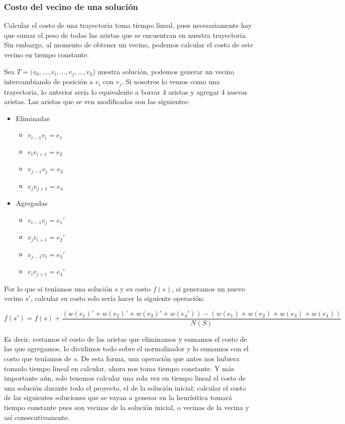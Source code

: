 \documentclass{article}
\begin{document}
  \subsubsection{Costo del vecino de una solución}
  Calcular el costo de una trayectoria toma tiempo lineal, pues 
  necesariamente hay que sumar el peso de todas las aristas que 
  se encuentran en nuestra trayectoria. Sin embargo, al momento 
  de obtener un vecino, podemos calcular el costo de este 
  vecino en tiempo constante.

  Sea $T = (v_0, ..., v_i, ..., v_j, ..., v_k$) nuestra 
  solución, podemos generar un vecino intercambiando de posición
  a $v_i$ con $v_j$. Si nosotros lo vemos como una trayectoria,
  lo anterior sería lo equivalente a borrar 4 aristas y 
  agregar 4 nuevas aristas. Las aristas que se ven modificadas
  son las siguientes:
  
  \begin{itemize}
    \item Eliminadas
      \begin{itemize}
        \item $v_{i-1}v_i = e_1$
        \item $v_iv_{i+1} = e_2$
        \item $v_{j-1}v_j = e_3$
        \item $v_jv_{j+1} = e_4$
      \end{itemize}
    \item Agregadas
      \begin{itemize}
        \item $v_{i-1}v_j = e_1'$
        \item $v_jv_{i+1} = e_2'$
        \item $v_{j-1}v_i = e_3'$
        \item $v_iv_{j+1} = e_4'$
      \end{itemize}
  \end{itemize}

  Por lo que si teníamos una solución $s$ y su costo $f(s)$, 
  si generamos un nuevo vecino $s'$, calcular su costo solo 
  sería hacer la siguiente operación:

  \[ f(s') = f(s) + 
             \frac{(w(e_1)' + w(e_2)' + w(e_3)' + w(e_4')) -
                   (w(e_1) + w(e_2) + w(e_3) +w(e_4))}{N(S)} \]

  Es decir, restamos el costo de las aristas que eliminamos y 
  sumamos el costo de las que agregamos, lo dividimos todo 
  sobre el normalizador y lo sumamos con el costo que 
  teníamos de $s$. De esta forma, una operación que 
  antes nos hubiera tomado tiempo lineal en calcular, ahora 
  nos toma tiempo constante. Y más importante aún, solo tenemos 
  calcular una sola vez en tiempo lineal el costo de una solución 
  durante todo el proyecto, el de la solución inicial; calcular el 
  costo de las siguientes soluciones que se vayan a generar en 
  la heurísitica tomará tiempo constante pues son vecinas de la 
  solución inicial, o vecinas de la vecina y así consecutivamente.
\end{document}
